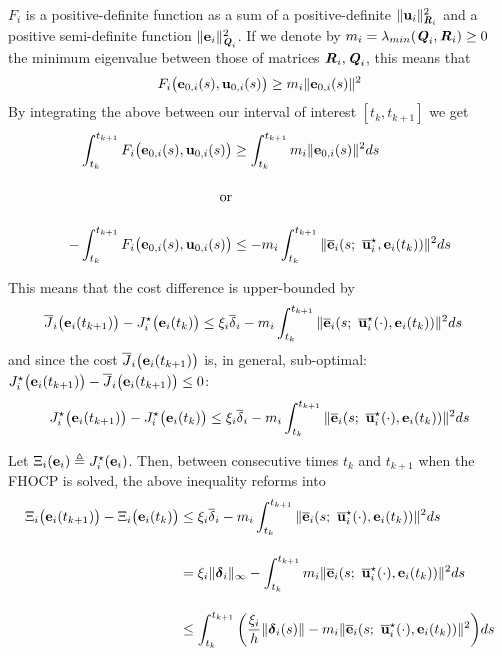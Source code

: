 \begin{gg_box}
  $F_i$ is a positive-definite function as a sum of a positive-definite
  $\|\bm{\mathbf{u}}_i\|^2_{\bm{\mathit{R}}_i}$ and a positive semi-definite function
  $\|\bm{\mathbf{e}}_i\|^2_{\bm{\mathit{Q}}_i}$. If we denote by
  $m_i = \lambda_{min}(\bm{\mathit{Q}}_i, \bm{\mathit{R}}_i) \geq 0$ the minimum eigenvalue
  between those of matrices $\bm{\mathit{R}}_i, \bm{\mathit{Q}}_i$, this means that
  \begin{align}
    F_i \big(\bm{\mathbf{e}}_{0,i}(s), \bm{\mathbf{u}}_{0,i} (s)\big) \geq m_i \|\bm{\mathbf{e}}_{0,i}(s)\|^2
  \end{align}
  By integrating the above between our interval of interest $[t_k, t_{k+1}]$ we get
  \begin{align}
    \int_{t_k}^{t_{k+1}} F_i \big(\vect{e}_{0,i}(s), \vect{u}_{0,i} (s)\big) &\geq \int_{t_k}^{t_{k+1}} m_i \|\vect{e}_{0,i}(s)\|^2 ds \\[2.5ex]
    \text{or}\\[2.5ex]
    -\int_{t_k}^{t_{k+1}} F_i \big(\vect{e}_{0,i}(s), \vect{u}_{0,i} (s)\big)
    &\leq -m_i \int_{t_k}^{t_{k+1}} \| \overline{\vect{e}}_i(s;\ \overline{\vect{u}}_i^{\star}, \vect{e}_i(t_k)) \|^2 ds
  \end{align}
\end{gg_box}
This means that the cost difference is upper-bounded by
\begin{align}
  \overline{J}_i\big(\bm{\mathbf{e}}_i(t_{k+1})\big) - J_i^{\star}\big(\bm{\mathbf{e}}_i(t_k)\big)
  &\leq \xi_i \overline{\delta}_i -m_i \int_{t_k}^{t_{k+1}} \| \overline{\bm{\mathbf{e}}}_i(s;\ \overline{\bm{\mathbf{u}}}_i^{\star}(\cdot), \bm{\mathbf{e}}_i(t_k)) \|^2 ds
\end{align}
and since the cost $\overline{J}_i\big(\bm{\mathbf{e}}_i(t_{k+1})\big)$ is, in general,
sub-optimal: $J_i^{\star}\big(\bm{\mathbf{e}}_i(t_{k+1})\big) - \overline{J}_i\big(\bm{\mathbf{e}}_i(t_{k+1})\big) \leq 0$:
\begin{align}
 J_i^{\star}\big(\bm{\mathbf{e}}_i(t_{k+1})\big) - J_i^{\star}\big(\bm{\mathbf{e}}_i(t_k)\big)
 \leq \xi_i \overline{\delta}_i - m_i \int_{t_k}^{t_{k+1}} \| \overline{\bm{\mathbf{e}}}_i(s;\ \overline{\bm{\mathbf{u}}}_i^{\star}(\cdot), \bm{\mathbf{e}}_i(t_k)) \|^2 ds
 \label{eq:J_opt_between_consecutive_k_2}
\end{align}

Let $\Xi_i(\bm{\mathbf{e}}_i) \triangleq J_i^{\star}(\bm{\mathbf{e}}_i)$. Then, between
consecutive times $t_k$ and $t_{k+1}$ when the FHOCP is solved, the above
inequality reforms into
\begin{align}
 \Xi_i\big(\vect{e}_i(t_{k+1})\big) - \Xi_i\big(\vect{e}_i(t_k)\big)
  &\leq \xi_i \overline{\delta}_i
  - m_i \int_{t_k}^{t_{k+1}} \| \overline{\vect{e}}_i(s;\ \overline{\vect{u}}_i^{\star}(\cdot), \vect{e}_i(t_k)) \|^2 ds \\[2.5ex]
  &= \xi_i \|\vect{\delta}_i\|_{\infty}
    - \int_{t_k}^{t_{k+1}} m_i \| \overline{\vect{e}}_i(s;\ \overline{\vect{u}}_i^{\star}(\cdot), \vect{e}_i(t_k)) \|^2 ds \\[2.5ex]
  &\leq \int_{t_k}^{t_{k+1}} \bigg( \dfrac{\xi_i}{h} \|\vect{\delta}_i(s)\|
    -  m_i \| \overline{\vect{e}}_i(s;\ \overline{\vect{u}}_i^{\star}(\cdot), \vect{e}_i(t_k)) \|^2 \bigg) ds
    \label{eq:check_for_ISS_here_main_branch}
\end{align}

